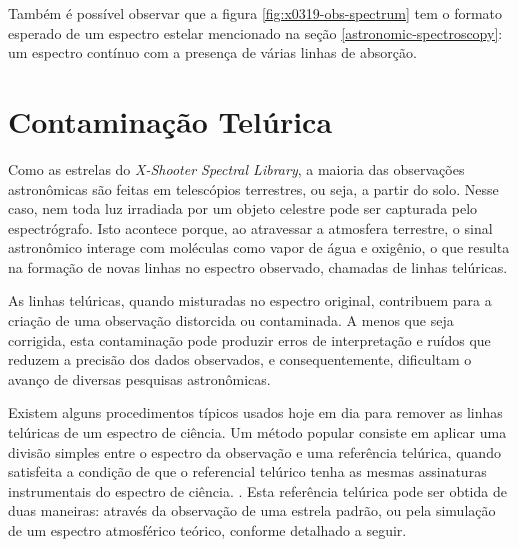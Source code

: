 Também é possível observar que a figura \ref{fig:x0319-obs-spectrum} tem o formato esperado de um espectro estelar mencionado na seção \ref{astronomic-spectroscopy}: um espectro contínuo com a presença de várias linhas de absorção.


\section{Contaminação Telúrica} \label{telluric-contamination}

Como as estrelas do \textit{X-Shooter Spectral Library}, a maioria das observações astronômicas são feitas em telescópios terrestres, ou seja, a partir do solo. Nesse caso, nem toda luz irradiada por um objeto celestre pode ser capturada pelo espectrógrafo. Isto acontece porque, ao atravessar a atmosfera terrestre, o sinal astronômico interage com moléculas como vapor de água e oxigênio, o que resulta na formação de novas linhas no espectro observado, chamadas de linhas telúricas. 

As linhas telúricas, quando misturadas no espectro original, contribuem para a criação de uma observação distorcida ou contaminada. A menos que seja corrigida, esta contaminação pode produzir erros de interpretação e ruídos que reduzem a precisão dos dados observados, e consequentemente, dificultam o avanço de diversas pesquisas astronômicas.

Existem alguns procedimentos típicos usados hoje em dia para remover as linhas telúricas de um espectro de ciência. Um método popular consiste em aplicar uma divisão simples entre o espectro da observação e uma referência telúrica, quando satisfeita a condição de que o referencial telúrico tenha as mesmas assinaturas instrumentais do espectro de ciência. . Esta referência telúrica pode ser obtida de duas maneiras: através da observação de uma estrela padrão, ou pela simulação de um espectro atmosférico teórico, conforme detalhado a seguir.

